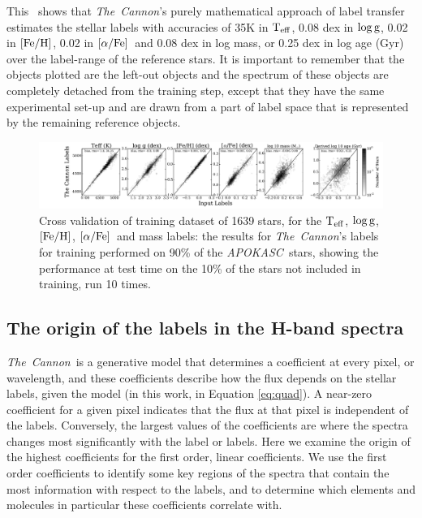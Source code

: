\documentclass[12pt, preprint]{aastex}
\newcommand{\project}[1]{\textsl{#1}}
\newcommand{\tc}{\project{The~Cannon}}
\newcommand{\apokasc}{\project{APOKASC}}
\newcommand{\teff}{\mbox{$\rm T_{eff}$}}
\newcommand{\feh}{\mbox{$\rm [Fe/H]$}}
\newcommand{\alphafe}{\mbox{$\rm [\alpha/Fe]$}}
\newcommand{\logg}{\mbox{$\rm \log g$}}
\begin{document}
This \figurename\ shows that \tc 's purely mathematical approach of label transfer estimates the stellar labels with accuracies of 35K in \teff, 0.08 dex in \logg, 0.02 in \feh, 0.02 in \alphafe\ and  0.08 dex in log mass, or 0.25 dex in log age (Gyr) over the label-range of the reference stars. It is important to remember that the objects plotted are the left-out objects and the spectrum of these objects are completely detached from the training step,  except that they have the same experimental set-up and are drawn from a part of label space that is represented by the remaining reference objects.

\begin{figure}[h!]
\centering
        \includegraphics[scale=0.35]{./plots/validation_1639_6.pdf}
  \caption{Cross validation of training dataset of 1639 stars, for the \teff, \logg, \feh, \alphafe\ and mass labels: the results for \tc's labels for training performed on 90\% of the \apokasc\ stars, showing the performance at test time on the 10\% of the stars not included in training, run 10 times.}
\label{fig:validation1}
\end{figure}

\subsection{The origin of the labels in the H-band spectra}

\tc\ is a generative model that determines a coefficient at every pixel, or wavelength, and these coefficients describe how the flux depends on the stellar labels, given the model (in this work, in Equation \ref{eq:quad}).   A near-zero coefficient for a given pixel indicates that the flux at that pixel is independent of the labels. Conversely, the largest values of the coefficients are where the spectra changes most significantly with the label or labels. Here we examine the origin of the highest coefficients for the first order, linear coefficients. We use the first order coefficients to identify some key regions of the spectra that contain the most information with respect to the labels, and to determine which elements and molecules in particular these coefficients correlate with. 
\end{document}
